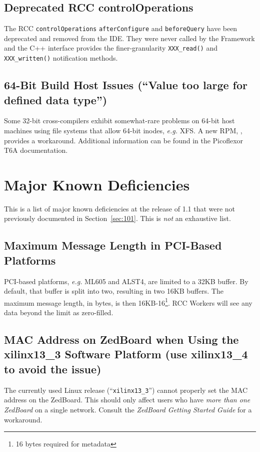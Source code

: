 \subsection{Deprecated RCC controlOperations}
The RCC \texttt{controlOperations} \texttt{afterConfigure} and \texttt{beforeQuery} have been deprecated and removed from the IDE. They were never called by the Framework and the C++ interface provides the finer-granularity \texttt{XXX\_read()} and \texttt{XXX\_written()} notification methods.

\subsection{64-Bit Build Host Issues (``Value too large for defined data type'')}
Some 32-bit cross-compilers exhibit somewhat-rare problems on 64-bit host machines using file systems that allow 64-bit inodes, \textit{e.g.} XFS. A new RPM, , provides a workaround. Additional information can be found in the Picoflexor T6A documentation.

\section{Major Known Deficiencies}
This is a list of major known deficiencies at the release of 1.1 that were not previously documented in Section~\ref{sec:101}. This is \textit{not} an exhaustive list.

\subsection{Maximum Message Length in PCI-Based Platforms}
\label{bug:1392}
PCI-based platforms, \textit{e.g.} ML605 and ALST4, are limited to a 32KB buffer. By default, that buffer is split into two, resulting in two 16KB buffers. The maximum message length, in bytes, is then 16KB-16\footnote{16 bytes required for metadata}. RCC Workers will see any data beyond the limit as zero-filled.

\subsection{MAC Address on ZedBoard when Using the xilinx13\_3 Software Platform (use xilinx13\_4 to avoid the issue)}
\label{bug:2400}
The currently used Linux release (``\texttt{xilinx13\_3}'') cannot properly set the MAC address on the ZedBoard. This should only affect users who have \textit{more than one ZedBoard} on a single network. Consult the \textit{ZedBoard Getting Started Guide} for a workaround.

